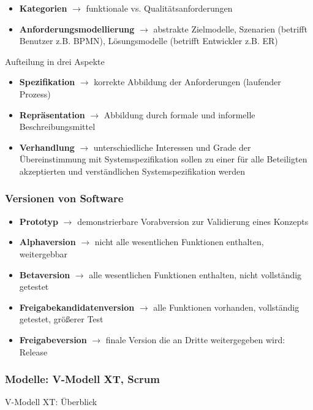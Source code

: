 \begin{itemize}
  \item \textbf{Kategorien} $\rightarrow$ funktionale vs. Qualitätsanforderungen
  \item \textbf{Anforderungsmodellierung} $\rightarrow$ abstrakte Zielmodelle, Szenarien (betrifft Benutzer z.B. BPMN), Lösungsmodelle (betrifft Entwickler z.B. ER)
\end{itemize}

Aufteilung in drei Aspekte

\begin{itemize}
  \item \textbf{Spezifikation} $\rightarrow$ korrekte Abbildung der Anforderungen (laufender Prozess)
  \item \textbf{Repräsentation} $\rightarrow$ Abbildung durch formale und informelle Beschreibungsmittel
  \item \textbf{Verhandlung} $\rightarrow$ unterschiedliche Interessen und Grade der Übereinstimmung mit Systemspezifikation sollen zu einer für alle Beteiligten akzeptierten und verständlichen Systemspezifikation werden
\end{itemize}

\subsubsection{Versionen von Software}
\begin{itemize}
  \item \textbf{Prototyp} $\rightarrow$ demonstrierbare Vorabversion zur Validierung eines Konzepts
  \item \textbf{Alphaversion} $\rightarrow$ nicht alle wesentlichen Funktionen enthalten, weitergebbar
  \item \textbf{Betaversion} $\rightarrow$ alle wesentlichen Funktionen enthalten, nicht vollständig getestet
  \item \textbf{Freigabekandidatenversion} $\rightarrow$ alle Funktionen vorhanden, vollständig getestet, größerer Test
  \item \textbf{Freigabeversion} $\rightarrow$ finale Version die an Dritte weitergegeben wird: Release
\end{itemize}

\subsubsection{Modelle: V-Modell XT, Scrum}
V-Modell XT: Überblick

